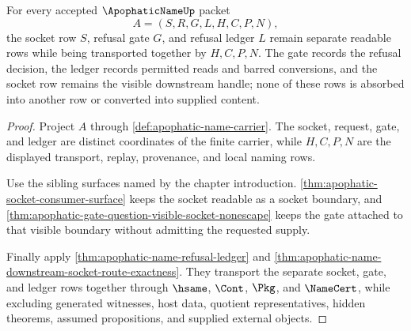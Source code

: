 \begin{theorem}
\label{thm:apophatic-name-gate-ledger-separation}
For every accepted $\ApophaticNameUp$ packet
$$
A=(S,R,G,L,H,C,P,N),
$$
the socket row $S$, refusal gate $G$, and refusal ledger $L$ remain separate readable rows while being transported together by $H,C,P,N$. The gate records the refusal decision, the ledger records permitted reads and barred conversions, and the socket row remains the visible downstream handle; none of these rows is absorbed into another row or converted into supplied content.
\end{theorem}
\begin{proof}
Project $A$ through \autoref{def:apophatic-name-carrier}. The socket, request, gate, and ledger are distinct coordinates of the finite carrier, while $H,C,P,N$ are the displayed transport, replay, provenance, and local naming rows.

Use the sibling surfaces named by the chapter introduction. \autoref{thm:apophatic-socket-consumer-surface} keeps the socket readable as a socket boundary, and \autoref{thm:apophatic-gate-question-visible-socket-nonescape} keeps the gate attached to that visible boundary without admitting the requested supply.

Finally apply \autoref{thm:apophatic-name-refusal-ledger} and \autoref{thm:apophatic-name-downstream-socket-route-exactness}. They transport the separate socket, gate, and ledger rows together through $\hsame$, $\Cont$, $\Pkg$, and $\NameCert$, while excluding generated witnesses, host data, quotient representatives, hidden theorems, assumed propositions, and supplied external objects.
\end{proof}

